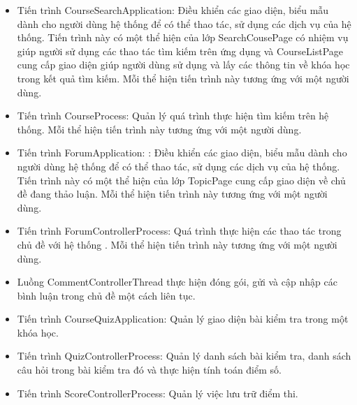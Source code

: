 \documentclass[./../main.tex]{subfiles}
\begin{document}
\begin{itemize}
	\item Tiến trình CourseSearchApplication: Điều khiển các giao diện, biểu mẫu dành cho người dùng hệ thống để có thể thao tác, sử dụng các dịch vụ của hệ thống. Tiến trình này có một thể hiện của lớp SearchCousePage có nhiệm vụ giúp người sử dụng các thao tác tìm kiếm trên ứng dụng và CourseListPage cung cấp giao diện giúp người dùng sử dụng và lấy các thông tin về khóa học trong kết quả tìm kiếm.
	      Mỗi thể hiện tiến trình này tương ứng với một người dùng.
	\item Tiến trình CourseProcess: Quản lý quá trình thực hiện tìm kiếm trên hệ thống.
	      Mỗi thể hiện tiến trình này tương ứng với một người dùng.

	\item Tiến trình ForumApplication: : Điều khiển các giao diện, biểu mẫu dành cho người dùng hệ thống để có thể thao tác, sử dụng các dịch vụ của hệ thống. Tiến trình này có một thể hiện của lớp TopicPage cung cấp giao diện về chủ đề đang thảo luận.
	      Mỗi thể hiện tiến trình này tương ứng với một người dùng.
	\item Tiến trình ForumControllerProcess: Quá trình thực hiện các thao tác trong chủ đề với hệ thống .
	      Mỗi thể hiện tiến trình này tương ứng với một người dùng.
	\item Luồng CommentControllerThread thực hiện đóng gói, gửi và cập nhập các bình luận trong chủ đề một cách liên tục.

	\item Tiến trình CourseQuizApplication: Quản lý giao diện bài kiểm tra trong một khóa học.
	\item Tiến trình QuizControllerProcess: Quản lý danh sách bài kiểm tra, danh sách câu hỏi trong bài kiểm tra đó và thực hiện tính toán điểm số.
	\item Tiến trình ScoreControllerProcess: Quản lý việc lưu trữ điểm thi.


\end{itemize}
\end{document}
